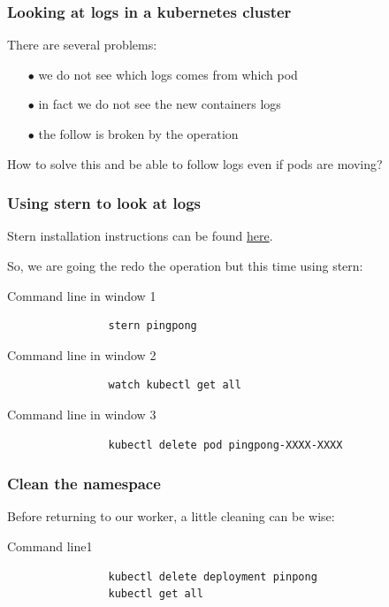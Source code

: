 	\begin{frame}[fragile]
		\frametitle{Looking at logs in a kubernetes cluster}
	
		There are several problems:
		\begin{itemize}
			\item[$\bullet$] we do not see which logs comes from which pod
			\item[$\bullet$] in fact we do not see the new containers logs
			\item[$\bullet$] the follow is broken by the operation
		\end{itemize}
		
		How to solve this and be able to follow logs even if pods are moving?
	\end{frame}

	\begin{frame}[fragile]
		\frametitle{Using stern to look at logs}

		Stern installation instructions can be found \href{https://github.com/wercker/stern}{here}.
		
		\bigskip
		So, we are going the redo the operation but this time using stern:
		\begin{block}{Command line in window 1}
			\begin{verbatim}
				stern pingpong
			\end{verbatim}
		\end{block}
				\begin{block}{Command line in window 2}
			\begin{verbatim}
				watch kubectl get all
			\end{verbatim}
		\end{block}
		\begin{block}{Command line in window 3}
			\begin{verbatim}
				kubectl delete pod pingpong-XXXX-XXXX
			\end{verbatim}
		\end{block}
	\end{frame}
	
	\begin{frame}[fragile]
		\frametitle{Clean the namespace}
		
		Before returning to our worker, a little cleaning can be wise:
		\begin{block}{Command line1}
			\begin{verbatim}
				kubectl delete deployment pinpong
				kubectl get all
			\end{verbatim}
		\end{block}
	\end{frame}
	
